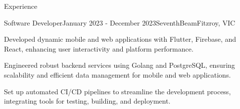 \documentclass[
	10pt, %
]{resume} %
\begin{document}
\begin{rSection}{Experience}

	\begin{rSubsection}{Software Developer}{January 2023 - December 2023}{SeventhBeam}{Fitzroy, VIC}
		\item Developed dynamic mobile and web applications with Flutter, Firebase, and React, enhancing user interactivity and platform performance.
		\item Engineered robust backend services using Golang and PostgreSQL, ensuring scalability and efficient data management for mobile and web applications.
		\item Set up automated CI/CD pipelines to streamline the development process, integrating tools for testing, building, and deployment.
    \end{rSubsection}

\end{rSection}

\end{document}
